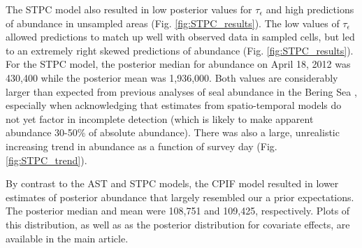 \documentclass[12pt,fleqn]{article}
\begin{document}
\begin{flushleft}
\hspace{.5in}The STPC model also resulted in low posterior values for $\tau_\epsilon$ and high predictions of abundance in unsampled areas (Fig. \ref{fig:STPC_results}).  The low values of $\tau_\epsilon$ allowed predictions to match up well with observed data in sampled cells, but led to an extremely right skewed predictions of abundance (Fig. \ref{fig:STPC_results}).  For the STPC model, the posterior median for abundance on April 18, 2012 was 430,400 while the posterior mean was 1,936,000.  Both values are considerably larger than expected from previous analyses of seal abundance in the Bering Sea \citep[e.g.][]{ConnEtAl2014,VerHoefEtAl2014}, especially when acknowledging that estimates from spatio-temporal models do not yet factor in incomplete detection (which is likely to make apparent abundance 30-50\% of absolute abundance).  There was also a large, unrealistic increasing trend in abundance as a function of survey day (Fig. \ref{fig:STPC_trend}).

\hspace{.5in}By contrast to the AST and STPC models, the CPIF model resulted in lower estimates of posterior abundance that largely resembled our a prior expectations.  The posterior median and mean were 108,751 and 109,425, respectively.  Plots of this distribution, as well as as the posterior distribution for covariate effects, are available in the main article.

\renewcommand{\refname}{Literature Cited}




\pagebreak


\end{flushleft}
\end{document}
